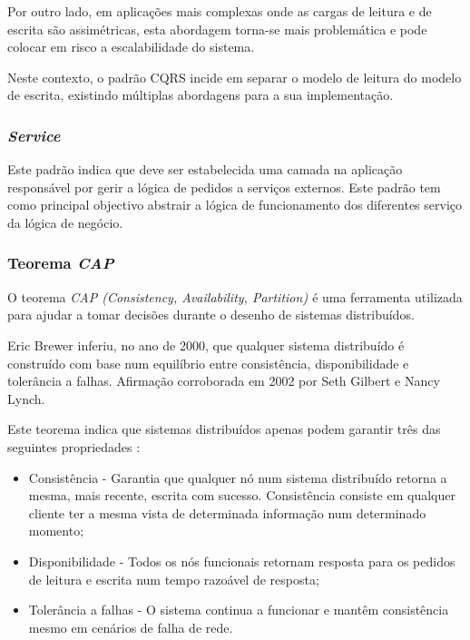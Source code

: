 Por outro lado, em aplicações mais complexas onde as cargas de leitura e de escrita são assimétricas, esta abordagem torna-se mais problemática e pode colocar em risco a escalabilidade do sistema.

Neste contexto, o padrão CQRS incide em separar o modelo de leitura do modelo de escrita, existindo múltiplas abordagens para a sua implementação. \cite{cqrs}

\subsubsection{\emph{Service} \label{service_pattern}}
Este padrão indica que deve ser estabelecida uma camada na aplicação responsável por gerir a lógica de pedidos a serviços externos. Este padrão tem como principal objectivo abstrair a lógica de funcionamento dos diferentes serviço da lógica de negócio\cite{service_design_patterns}.

\subsubsection{Teorema \emph{CAP}} \label{cap_theorem}
O teorema \emph{CAP (Consistency, Availability, Partition) \label{sym:cap}} é uma ferramenta utilizada para ajudar a tomar decisões durante o desenho de sistemas distribuídos.

Eric Brewer inferiu, no ano de 2000, que qualquer sistema distribuído é construído com base num equilíbrio entre consistência, disponibilidade e tolerância a falhas. Afirmação corroborada em 2002 por Seth Gilbert e Nancy Lynch.

Este teorema indica que sistemas distribuídos apenas podem garantir três das seguintes propriedades \cite{cap_theorem}:

\begin{itemize}
    \item Consistência - Garantia que qualquer nó num sistema distribuído retorna a mesma, mais recente, escrita com sucesso. Consistência consiste em qualquer cliente ter a mesma vista de determinada informação num determinado momento;
    \item Disponibilidade - Todos os nós funcionais retornam resposta para os pedidos de leitura e escrita num tempo razoável de resposta;
    \item Tolerância a falhas - O sistema continua a funcionar e mantêm consistência mesmo em cenários de falha de rede.
\end{itemize}

